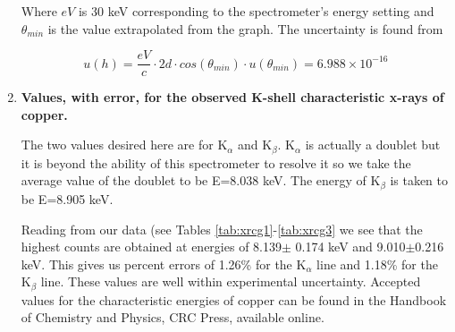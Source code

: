 \begin{enumerate}
\noindent Where $eV$ is 30 keV corresponding to the spectrometer's energy setting and $\theta_{min}$ is the value extrapolated from the graph. The uncertainty is found from

\begin{equation}
u(h)=\dfrac{eV}{c}\cdot 2d\cdot cos(\theta_{min})\cdot u(\theta_{min})=6.988\times10^{-16}
\label{equ:twcg4}
\end{equation}

\item {\bf Values, with error, for the observed K-shell characteristic x-rays of copper.}\newline

The two values desired here are for K$_{\alpha}$ and K$_{\beta}$. K$_{\alpha}$ is actually a doublet but it is beyond the ability of this spectrometer to resolve it so we take the average value of the doublet to be E=8.038 keV. The energy of K$_{\beta}$ is taken to be E=8.905 keV. 

Reading from our data (see Tables \ref{tab:xrcg1}-\ref{tab:xrcg3} we see that the highest counts are obtained at energies of 8.139$\pm$ 0.174 keV and 9.010$\pm$0.216 keV. This gives us percent errors of 1.26\% for the K$_{\alpha}$ line and 1.18\% for the K$_{\beta}$ line. These values are well within experimental uncertainty. Accepted values for the characteristic energies of copper can be found in the Handbook of Chemistry and Physics, CRC Press, available online.


\end{enumerate}


